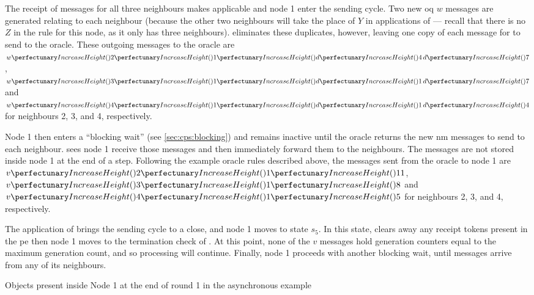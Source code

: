 The receipt of messages for all three neighbours makes  applicable and node 1 enter the sending cycle.  Two new \gls{oq} \(w\) messages are generated relating to each neighbour (because the other two neighbours will take the place of \(Y\) in applications of  --- recall that there is no \(Z\) in the rule for this node, as it only has three neighbours).   eliminates these duplicates, however, leaving one copy of each message for  to send to the oracle.  These outgoing messages to the oracle are \(\cpvw{2}{1}{\cpfunc{d}{4} \, \cpfunc{d}{7}}\), \(\cpvw{3}{1}{\cpfunc{d}{1} \, \cpfunc{d}{7}}\) and \(\cpvw{4}{1}{\cpfunc{d}{1} \, \cpfunc{d}{4}}\) for neighbours 2, 3, and 4, respectively.

Node 1 then enters a ``blocking wait'' (see \cref{sec:cps:blocking}) and remains inactive until the oracle returns the new \gls{nm} messages to send to each neighbour.   sees node 1 receive those messages and then immediately forward them to the neighbours.  The messages are not stored inside node 1 at the end of a step.  Following the example oracle rules described above, the messages sent from the oracle to node 1 are \(\cpvv{2}{1}{11}\), \(\cpvv{3}{1}{8}\) and \(\cpvv{4}{1}{5}\) for neighbours 2, 3, and 4, respectively.

The application of  brings the sending cycle to a close, and node 1 moves to state \(s_5\).  In this state,  clears away any receipt tokens present in the \gls{pe} then node 1 moves to the termination check of .  At this point, none of the \(v\) messages hold generation counters equal to the maximum generation count, and so processing will continue.  Finally, node 1 proceeds with another blocking wait, until messages arrive from any of its neighbours.

\begin{cpobjectsfloat}
\begin{cpobjects}
\end{cpobjects}
\caption{\label{objs:nmp:ex1}Objects present inside Node 1 at the end of round 1 in the asynchronous  example}
\end{cpobjectsfloat}

